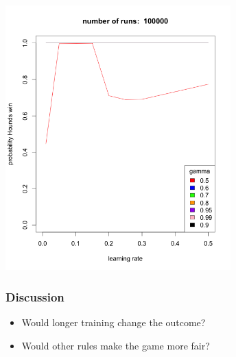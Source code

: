 \documentclass{beamer}
\begin{document}
\begin{frame}
    \centering
    \includegraphics[width=0.65\textwidth]{r100000.png}
\end{frame}


\begin{frame}
	\frametitle{Discussion}
	\begin{itemize}
		\item Would longer training change the outcome?
		\item Would other rules make the game more fair?
	\end{itemize}
\end{frame}
\end{document}
